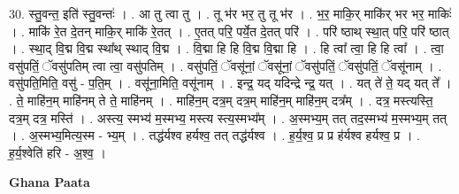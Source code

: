 \documentclass[17pt]{extarticle}
\begin{document}
30. स्तु॒वन्त॒ इति॑ स्तु॒वन्तः॑ । . आ तु त्वा तु । . तू भ॑र भर॒ तु तू भ॑र । . भ॒र॒ माकि॒र् माकि॑र् भर भर॒ माकिः॑ । . माकि॑ रे॒त दे॒तन् माकि॒र् माकि॑ रे॒तत् । . ए॒तत् परि॒ पर्ये॒त दे॒तत् परि॑ । . परि॑ ष्ठाथ् स्था॒त् परि॒ परि॑ ष्ठात् । . स्था॒द् वि॒द्म वि॒द्म स्था᳚थ् स्थाद् वि॒द्म । . वि॒द्मा हि हि वि॒द्म वि॒द्मा हि । . हि त्वा᳚ त्वा॒ हि हि त्वा᳚ । . त्वा॒ वसु॑पतिं॒ ॅवसु॑पतिम् त्वा त्वा॒ वसु॑पतिम् । . वसु॑पतिं॒ ॅवसू॑नां॒ ॅवसू॑नां॒ ॅवसु॑पतिं॒ ॅवसु॑पतिं॒ ॅवसू॑नाम् । . वसु॑पति॒मिति॒ वसु॑ - प॒ति॒म् । . वसू॑ना॒मिति॒ वसू॑नाम् । . इन्द्र॒ यद् यदिन्द्रे न्द्र॒ यत् । . यत् ते॑ ते॒ यद् यत् ते᳚ । . ते॒ माहि॑न॒म् माहि॑नम् ते ते॒ माहि॑नम् । . माहि॑न॒म् दत्र॒म् दत्र॒म् माहि॑न॒म् माहि॑न॒म् दत्र᳚म् । . दत्र॒ मस्त्यस्ति॒ दत्र॒म् दत्र॒ मस्ति॑ । . अस्त्य॒ स्मभ्य॑ म॒स्मभ्य॒ मस्त्य स्त्य॒स्मभ्य᳚म् । . अ॒स्मभ्य॒म् तत् तद॒स्मभ्य॑ म॒स्मभ्य॒म् तत् । . अ॒स्मभ्य॒मित्य॒स्म - भ्य॒म् । . तद्ध॑र्यश्व हर्यश्व॒ तत् तद्ध॑र्यश्व । . ह॒र्य॒श्व॒ प्र प्र ह॑र्यश्व हर्यश्व॒ प्र । . ह॒र्य॒श्वेति॑ हरि - अ॒श्व॒ । \newline

\textbf{Ghana Paata } \newline
\end{document}
